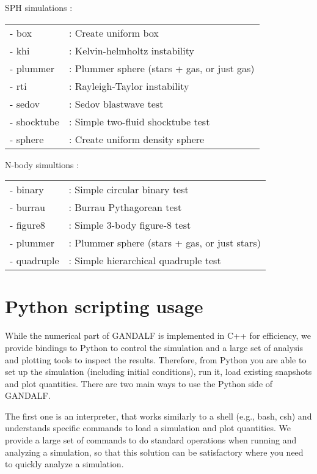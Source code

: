 \documentclass[a4paper]{article}
\begin{document}
\noindent SPH simulations : \\
\begin{tabular}{ll}
- box       &: Create uniform box \\
- khi       &: Kelvin-helmholtz instability \\
- plummer   &: Plummer sphere (stars + gas, or just gas) \\
- rti       &: Rayleigh-Taylor instability \\
- sedov     &: Sedov blastwave test \\
- shocktube &: Simple two-fluid shocktube test \\
- sphere    &: Create uniform density sphere
\end{tabular}
\newline

\noindent N-body simultions : \\
\begin{tabular}{ll}
- binary    &: Simple circular binary test \\
- burrau    &: Burrau Pythagorean test \\
- figure8   &: Simple 3-body figure-8 test \\
- plummer   &: Plummer sphere (stars + gas, or just stars) \\
- quadruple &: Simple hierarchical quadruple test
\end{tabular}

\newpage



\section{Python scripting usage}

While the numerical part of GANDALF  is implemented in C++ for efficiency, we provide bindings to Python to control the simulation and a large set of analysis and plotting tools to inspect the results. Therefore, from Python you are able to set up the simulation (including initial conditions), run it, load existing snapshots and plot quantities. There are two main ways to use the Python side of GANDALF.

The first one is an interpreter, that works similarly to a shell (e.g., bash, csh) and understands specific commands to load a simulation and plot quantities. We provide a large set of commands to do standard operations when running and analyzing a simulation, so that this solution can be satisfactory where you need to quickly analyze a simulation.
\end{document}
